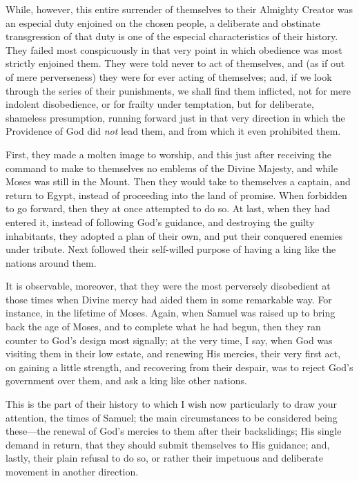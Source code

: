 While, however, this entire surrender of themselves to their
Almighty Creator was an especial duty enjoined on the chosen people, a
deliberate and obstinate transgression of that duty is one of the
especial characteristics of their history. They failed most
conspicuously in that very point in which obedience was most strictly
enjoined them. They were told never to act of themselves, and (as if
out of mere perverseness) they were for ever acting of themselves;
and, if we look through the series of their punishments, we shall find
them inflicted, not for mere indolent disobedience, or for frailty
under temptation, but for deliberate, shameless presumption, running
forward just in that very direction in which the Providence of God did
\emph{not} lead them, and from which it even prohibited them.

First, they made a molten image to worship, and this just after
receiving the command to make to themselves no emblems of the Divine
Majesty, and while Moses was still in the Mount. Then they would take
to themselves a captain, and return to Egypt, instead of proceeding
into the land of promise. When forbidden to go forward, then they at
once attempted to do so. At last, when they had entered it, instead of
following God's guidance, and destroying the guilty inhabitants,
they adopted a plan of their own, and put their conquered enemies
under tribute. Next followed their self-willed purpose of having a
king like the nations around them.

It is observable, moreover, that they were the most perversely
disobedient at those times when Divine mercy had aided them in some
remarkable way. For instance, in the lifetime of Moses. Again, when
Samuel was raised up to bring back the age of Moses, and to complete
what he had begun, then they ran counter to God's design most
signally; at the very time, I say, when God was visiting them in their
low estate, and renewing His mercies, their very first act, on gaining
a little strength, and recovering from their despair, was to reject
God's government over them, and ask a king like other nations.

This is the part of their history to which I wish now particularly
to draw your attention, the times of Samuel; the main circumstances to
be considered being these—the renewal of God's mercies to them
after their backslidings; His single demand in return, that they
should submit themselves to His guidance; and, lastly, their plain
refusal to do so, or rather their impetuous and deliberate movement in
another direction.

